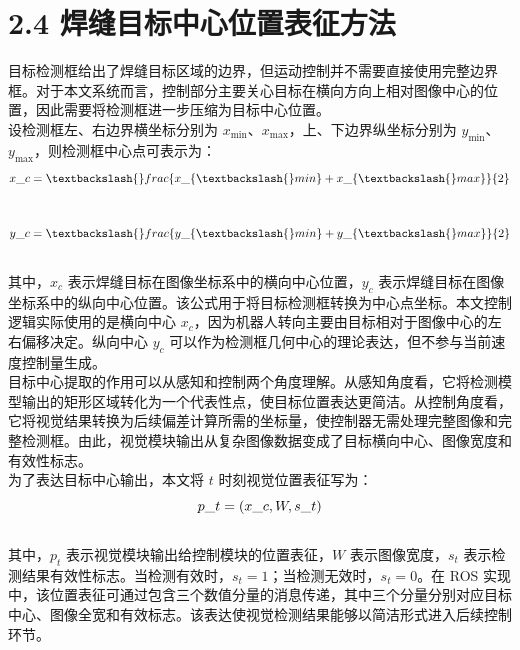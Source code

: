 \documentclass[UTF8,a4paper,12pt]{ctexrep}
\begin{document}
\section{2.4 焊缝目标中心位置表征方法}

目标检测框给出了焊缝目标区域的边界，但运动控制并不需要直接使用完整边界框。对于本文系统而言，控制部分主要关心目标在横向方向上相对图像中心的位置，因此需要将检测框进一步压缩为目标中心位置。\\

设检测框左、右边界横坐标分别为 $x_{\min}$、$x_{\max}$，上、下边界纵坐标分别为 $y_{\min}$、$y_{\max}$，则检测框中心点可表示为：\\

$$\\
x\_c = \textbackslash\{\}frac\{x\_\{\textbackslash\{\}min\}+x\_\{\textbackslash\{\}max\}\}\{2\}\\
$$\\

$$\\
y\_c = \textbackslash\{\}frac\{y\_\{\textbackslash\{\}min\}+y\_\{\textbackslash\{\}max\}\}\{2\}\\
$$\\

其中，$x_c$ 表示焊缝目标在图像坐标系中的横向中心位置，$y_c$ 表示焊缝目标在图像坐标系中的纵向中心位置。该公式用于将目标检测框转换为中心点坐标。本文控制逻辑实际使用的是横向中心 $x_c$，因为机器人转向主要由目标相对于图像中心的左右偏移决定。纵向中心 $y_c$ 可以作为检测框几何中心的理论表达，但不参与当前速度控制量生成。\\

目标中心提取的作用可以从感知和控制两个角度理解。从感知角度看，它将检测模型输出的矩形区域转化为一个代表性点，使目标位置表达更简洁。从控制角度看，它将视觉结果转换为后续偏差计算所需的坐标量，使控制器无需处理完整图像和完整检测框。由此，视觉模块输出从复杂图像数据变成了目标横向中心、图像宽度和有效性标志。\\

为了表达目标中心输出，本文将 $t$ 时刻视觉位置表征写为：\\

$$\\
p\_t = (x\_c,W,s\_t)\\
$$\\

其中，$p_t$ 表示视觉模块输出给控制模块的位置表征，$W$ 表示图像宽度，$s_t$ 表示检测结果有效性标志。当检测有效时，$s_t=1$；当检测无效时，$s_t=0$。在 ROS 实现中，该位置表征可通过包含三个数值分量的消息传递，其中三个分量分别对应目标中心、图像全宽和有效标志。该表达使视觉检测结果能够以简洁形式进入后续控制环节。\\
\end{document}
